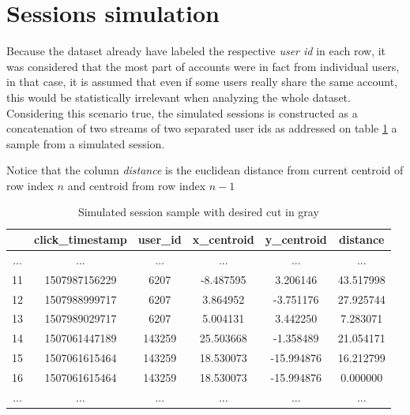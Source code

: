 \documentclass[ecp,tc,english]{iiufrgs}
\begin{document}
        \section{Sessions simulation} \label{session_simulation}
        Because the dataset already have labeled the respective \textit{user id} in each row, it was considered that the most part of accounts were in fact from individual users, in that case, it is assumed that even if some users really share the same account, this would be statistically irrelevant when analyzing the whole dataset.
        Considering this scenario true, the simulated sessions is constructed as a concatenation of two streams of two separated user ids 
        as addressed on table \ref{session_simulation} a sample from a simulated session.
        
        Notice that the column \textit{distance} is the euclidean distance from current centroid of row index \(n\) and centroid from row index \(n - 1\)
        
        \begin{table}[!ht]
            \centering
            \begin{tabular}{ |c|c|c|c|c|c| } 
                \hline
                \  & click\_timestamp & user\_id & x\_centroid & y\_centroid & distance \\
                \hline 
                 ... & ... & ... & ... & ... & ... \\
                 11 & 1507987156229 & 6207 & -8.487595 & 3.206146 & 43.517998 \\
                 12 & 1507988999717 & 6207 & 3.864952 & -3.751176 & 27.925744 \\
                 13 & 1507989029717 & 6207 & 5.004131 & 3.442250 & 7.283071 \\
                 \rowcolor[RGB]{220,220,220}
                 14 & 1507061447189 & 143259 & 25.503668 & -1.358489 & 21.054171 \\
                 15 & 1507061615464 & 143259 & 18.530073 & -15.994876 & 16.212799 \\
                 16 & 1507061615464 & 143259 & 18.530073 & -15.994876 & 0.000000 \\
                 ... & ... & ... & ... & ... & ... \\
                \hline
            \end{tabular}
            \caption{Simulated session sample with desired cut in gray}
            \label{tab:session_simulation}
        \end{table}
        
\end{document}
